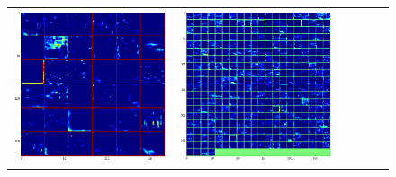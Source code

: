 \begin{figure}[!htb]
\begin{center}
\begin{tabular}{|c|c|c|c|c|c|}
\includegraphics[scale=0.1]{sunny2_caffe_conv2_fm.png} &
\includegraphics[scale=0.1]{sunny2_caffe_conv3_fm.png} &

\end{tabular}
\end{center}
\end{figure}
